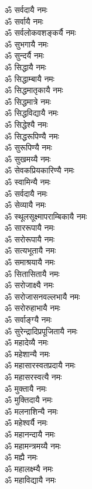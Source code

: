 \begin{flushleft}
\begin{multicols}{2}
ॐ सर्वदायै नमः\hfill{}\\
ॐ सर्वायै नमः\\
ॐ सर्वलोकवशङ्कर्यै नमः\\
ॐ सुभगायै नमः\\
ॐ सुन्दर्यै नमः\\
ॐ सिद्धायै नमः\\
ॐ सिद्धाम्बायै नमः\\
ॐ सिद्धमातृकायै नमः\\
ॐ सिद्धमात्रे नमः\\
ॐ सिद्धविद्यायै नमः\\
ॐ सिद्धेश्यै नमः\hfill{}\\
ॐ सिद्धरूपिण्यै नमः\\
ॐ सुरूपिण्यै नमः\\
ॐ सुखमय्यै नमः\\
ॐ सेवकप्रियकारिण्यै नमः\\
ॐ स्वामिन्यै नमः\\
ॐ सर्वदायै नमः\\
ॐ सेव्यायै नमः\\
ॐ स्थूलसूक्ष्मापराम्बिकायै नमः\\
ॐ साररूपायै नमः\\
ॐ सरोरूपायै नमः\hfill{}\\
ॐ सत्यभूतायै नमः\\
ॐ समाश्रयायै नमः\\
ॐ सितासितायै नमः\\
ॐ सरोजाक्ष्यै नमः\\
ॐ सरोजासनवल्लभायै नमः\\
ॐ सरोरुहाभायै नमः\\
ॐ सर्वाङ्ग्यै नमः\\
ॐ सुरेन्द्रादिप्रपूजितायै नमः\\
ॐ महादेव्यै नमः\\
ॐ महेशान्यै नमः\hfill{}\\
ॐ महासारस्वतप्रदायै नमः\\
ॐ महासरस्वत्यै नमः\\
ॐ मुक्तायै नमः\\
ॐ मुक्तिदायै नमः\\
ॐ मलनाशिन्यै नमः\\
ॐ महेश्वर्यै नमः\\
ॐ महानन्दायै नमः\\
ॐ महामन्त्रमय्यै नमः\\
ॐ मह्यै नमः\\
ॐ महालक्ष्म्यै नमः\hfill{}\\
ॐ महाविद्यायै नमः\\

\end{multicols}
\end{flushleft}
